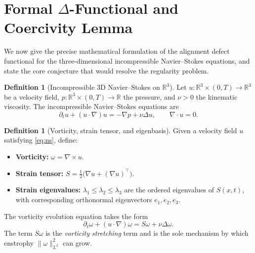 \documentclass[11pt]{article}
\theoremstyle{definition}
\newtheorem{definition}[theorem]{Definition}
\theoremstyle{remark}
\newcommand{\R}{\mathbb{R}}
\begin{document}
\section{Formal $\Delta$-Functional and Coercivity Lemma}
\label{sec:delta-coercivity}

We now give the precise mathematical formulation of the alignment defect
functional for the three-dimensional incompressible Navier--Stokes equations,
and state the core conjecture that would resolve the regularity problem.

\medskip

\begin{definition}[Incompressible 3D Navier--Stokes on $\R^3$]
\label{def:ns-equations}
Let $u \colon \R^3 \times (0,T) \to \R^3$ be a velocity field,
$p \colon \R^3 \times (0,T) \to \R$ the pressure, and $\nu > 0$ the
kinematic viscosity.  The incompressible Navier--Stokes equations are
\begin{equation}\label{eq:ns}
\partial_t u + (u \cdot \nabla) u = -\nabla p + \nu \Delta u, \qquad
\nabla \cdot u = 0.
\end{equation}
\end{definition}

\begin{definition}[Vorticity, strain tensor, and eigenbasis]
\label{def:vorticity-strain}
Given a velocity field $u$ satisfying \eqref{eq:ns}, define:
\begin{itemize}[leftmargin=2em]
\item \textbf{Vorticity:} $\omega = \nabla \times u$.
\item \textbf{Strain tensor:} $S = \tfrac{1}{2}\bigl(\nabla u + (\nabla u)^{\!\top}\bigr)$.
\item \textbf{Strain eigenvalues:} $\lambda_1 \leq \lambda_2 \leq \lambda_3$
  are the ordered eigenvalues of $S(x,t)$, with corresponding orthonormal
  eigenvectors $e_1, e_2, e_3$.
\end{itemize}
The vorticity evolution equation takes the form
\begin{equation}\label{eq:vorticity-evolution}
\partial_t \omega + (u \cdot \nabla)\omega = S\omega + \nu \Delta \omega.
\end{equation}
The term $S\omega$ is the \emph{vorticity stretching} term and is the
sole mechanism by which enstrophy $\|\omega\|_{L^2}^2$ can grow.
\end{definition}
\end{document}
